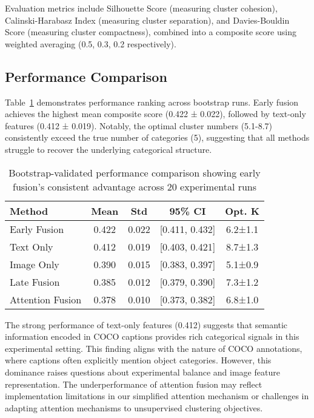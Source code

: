 \documentclass[sigconf]{acmart}
\begin{document}
Evaluation metrics include Silhouette Score (measuring cluster cohesion), Calinski-Harabasz Index (measuring cluster separation), and Davies-Bouldin Score (measuring cluster compactness), combined into a composite score using weighted averaging (0.5, 0.3, 0.2 respectively).

\subsection{Performance Comparison}

Table~\ref{tab:performance} demonstrates performance ranking across bootstrap runs. Early fusion achieves the highest mean composite score (0.422 ± 0.022), followed by text-only features (0.412 ± 0.019). Notably, the optimal cluster numbers (5.1-8.7) consistently exceed the true number of categories (5), suggesting that all methods struggle to recover the underlying categorical structure.

\begin{table}[h!]
\centering
\small
\caption{Bootstrap-validated performance comparison showing early fusion's consistent advantage across 20 experimental runs}
\label{tab:performance}
\begin{tabular}{@{}lcccc@{}}
\toprule
\textbf{Method} & \textbf{Mean} & \textbf{Std} & \textbf{95\% CI} & \textbf{Opt. K} \\
\midrule
Early Fusion & 0.422 & 0.022 & [0.411, 0.432] & 6.2±1.1 \\
Text Only & 0.412 & 0.019 & [0.403, 0.421] & 8.7±1.3 \\
Image Only & 0.390 & 0.015 & [0.383, 0.397] & 5.1±0.9 \\
Late Fusion & 0.385 & 0.012 & [0.379, 0.390] & 7.3±1.2 \\
Attention Fusion & 0.378 & 0.010 & [0.373, 0.382] & 6.8±1.0 \\
\bottomrule
\end{tabular}
\end{table}

The strong performance of text-only features (0.412) suggests that semantic information encoded in COCO captions provides rich categorical signals in this experimental setting. This finding aligns with the nature of COCO annotations, where captions often explicitly mention object categories. However, this dominance raises questions about experimental balance and image feature representation. The underperformance of attention fusion may reflect implementation limitations in our simplified attention mechanism or challenges in adapting attention mechanisms to unsupervised clustering objectives.
\end{document}

